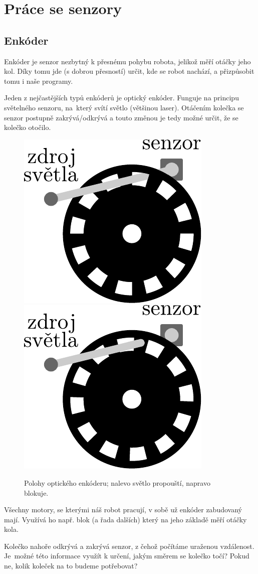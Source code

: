 \documentclass[../main.tex]{subfiles}
\begin{document}
	\section{Práce se senzory}
	
	\subsection{Enkóder}\label{cha:encoder}
	Enkóder je senzor nezbytný k přesnému pohybu robota, jelikož měří otáčky jeho kol. Díky tomu jde (s dobrou přesností) určit, kde se robot nachází, a přizpůsobit tomu i naše programy.

	Jeden z nejčastějších typů enkóderů je optický enkóder. Funguje na principu světelného senzoru, na~který svítí světlo (většinou laser). Otáčením kolečka se senzor postupně zakrývá/odkrývá a touto změnou je tedy možné určit, že se kolečko otočilo.

	\begin{figure}
		\centering%
		\includegraphics[width=0.25\linewidth]{Images/03/encoder-through.pdf}
		\hspace{.15\textwidth}%
		\includegraphics[width=0.25\linewidth]{Images/03/encoder-blocked.pdf}
		\caption{Polohy optického enkóderu; nalevo světlo propouští, napravo blokuje.}
	\end{figure}

	Všechny motory, se kterými náš robot pracují, v sobě už enkóder zabudovaný mají. Využívá ho např. blok \blockMotorDistanceImage (a řada dalších) který na jeho základě měří otáčky kola.

	\begin{question}
		Kolečko nahoře odkrývá a zakrývá senzor, z čehož počítáme uraženou vzdálenost. Je~možné této informace využít k určení, jakým směrem se kolečko točí? Pokud ne, kolik koleček na to budeme potřebovat?
	\end{question}
\end{document}
